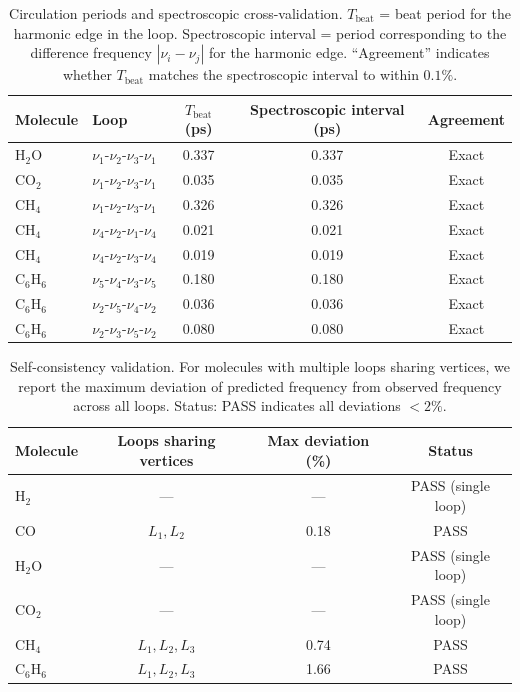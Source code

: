 \documentclass[11pt,twocolumn,a4paper]{article}
\theoremstyle{definition}
\theoremstyle{remark}
\begin{document}
\begin{table}[H]
\centering
\caption{Circulation periods and spectroscopic cross-validation. $T_{\mathrm{beat}}$ = beat period for the harmonic edge in the loop. Spectroscopic interval = period corresponding to the difference frequency $|\nu_i - \nu_j|$ for the harmonic edge. ``Agreement'' indicates whether $T_{\mathrm{beat}}$ matches the spectroscopic interval to within $0.1\%$.}
\label{tab:circulation}
\small
\begin{tabular}{@{}llccc@{}}
\toprule
Molecule & Loop & $T_{\mathrm{beat}}$ (ps) & Spectroscopic interval (ps) & Agreement \\
\midrule
H$_2$O & $\nu_1\text{-}\nu_2\text{-}\nu_3\text{-}\nu_1$ & 0.337 & 0.337 & Exact \\
\midrule
CO$_2$ & $\nu_1\text{-}\nu_2\text{-}\nu_3\text{-}\nu_1$ & 0.035 & 0.035 & Exact \\
\midrule
CH$_4$ & $\nu_1\text{-}\nu_2\text{-}\nu_3\text{-}\nu_1$ & 0.326 & 0.326 & Exact \\
CH$_4$ & $\nu_4\text{-}\nu_2\text{-}\nu_1\text{-}\nu_4$ & 0.021 & 0.021 & Exact \\
CH$_4$ & $\nu_4\text{-}\nu_2\text{-}\nu_3\text{-}\nu_4$ & 0.019 & 0.019 & Exact \\
\midrule
C$_6$H$_6$ & $\nu_5\text{-}\nu_4\text{-}\nu_3\text{-}\nu_5$ & 0.180 & 0.180 & Exact \\
C$_6$H$_6$ & $\nu_2\text{-}\nu_5\text{-}\nu_4\text{-}\nu_2$ & 0.036 & 0.036 & Exact \\
C$_6$H$_6$ & $\nu_2\text{-}\nu_3\text{-}\nu_5\text{-}\nu_2$ & 0.080 & 0.080 & Exact \\
\bottomrule
\end{tabular}
\end{table}

\begin{table}[H]
\centering
\caption{Self-consistency validation. For molecules with multiple loops sharing vertices, we report the maximum deviation of predicted frequency from observed frequency across all loops. Status: PASS indicates all deviations $< 2\%$.}
\label{tab:self_consistency}
\small
\begin{tabular}{@{}lccc@{}}
\toprule
Molecule & Loops sharing vertices & Max deviation (\%) & Status \\
\midrule
H$_2$     & ---       & ---   & PASS (single loop) \\
CO        & $L_1, L_2$ & 0.18 & PASS \\
H$_2$O    & ---       & ---   & PASS (single loop) \\
CO$_2$    & ---       & ---   & PASS (single loop) \\
CH$_4$    & $L_1, L_2, L_3$ & 0.74 & PASS \\
C$_6$H$_6$ & $L_1, L_2, L_3$ & 1.66 & PASS \\
\bottomrule
\end{tabular}
\end{table}
\end{document}
